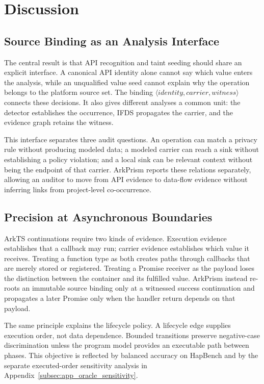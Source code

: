\section{Discussion}
\label{sec:discussion}

\subsection{Source Binding as an Analysis Interface}

The central result is that API recognition and taint seeding should share an explicit interface. A canonical API identity alone cannot say which value enters the analysis, while an unqualified value seed cannot explain why the operation belongs to the platform source set. The binding $\langle identity,carrier,witness\rangle$ connects these decisions. It also gives different analyses a common unit: the detector establishes the occurrence, IFDS propagates the carrier, and the evidence graph retains the witness.

This interface separates three audit questions. An operation can match a privacy rule without producing modeled data; a modeled carrier can reach a sink without establishing a policy violation; and a local sink can be relevant context without being the endpoint of that carrier. ArkPrism reports these relations separately, allowing an auditor to move from API evidence to data-flow evidence without inferring links from project-level co-occurrence.

\subsection{Precision at Asynchronous Boundaries}

ArkTS continuations require two kinds of evidence. Execution evidence establishes that a callback may run; carrier evidence establishes which value it receives. Treating a function type as both creates paths through callbacks that are merely stored or registered. Treating a Promise receiver as the payload loses the distinction between the container and its fulfilled value. ArkPrism instead re-roots an immutable source binding only at a witnessed success continuation and propagates a later Promise only when the handler return depends on that payload.

The same principle explains the lifecycle policy. A lifecycle edge supplies execution order, not data dependence. Bounded transitions preserve negative-case discrimination unless the program model provides an executable path between phases. This objective is reflected by balanced accuracy on HapBench and by the separate executed-order sensitivity analysis in Appendix~\ref{subsec:app_oracle_sensitivity}.

